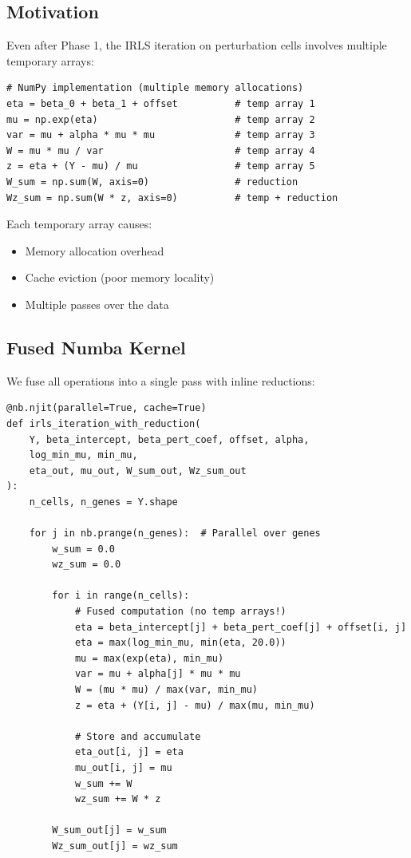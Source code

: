 \documentclass{article}
\begin{document}
\subsection{Motivation}

Even after Phase 1, the IRLS iteration on perturbation cells involves multiple temporary arrays:
\begin{lstlisting}
# NumPy implementation (multiple memory allocations)
eta = beta_0 + beta_1 + offset          # temp array 1
mu = np.exp(eta)                        # temp array 2
var = mu + alpha * mu * mu              # temp array 3
W = mu * mu / var                       # temp array 4
z = eta + (Y - mu) / mu                 # temp array 5
W_sum = np.sum(W, axis=0)               # reduction
Wz_sum = np.sum(W * z, axis=0)          # temp + reduction
\end{lstlisting}

Each temporary array causes:
\begin{itemize}
    \item Memory allocation overhead
    \item Cache eviction (poor memory locality)
    \item Multiple passes over the data
\end{itemize}

\subsection{Fused Numba Kernel}

We fuse all operations into a single pass with inline reductions:

\begin{lstlisting}
@nb.njit(parallel=True, cache=True)
def irls_iteration_with_reduction(
    Y, beta_intercept, beta_pert_coef, offset, alpha,
    log_min_mu, min_mu,
    eta_out, mu_out, W_sum_out, Wz_sum_out
):
    n_cells, n_genes = Y.shape
    
    for j in nb.prange(n_genes):  # Parallel over genes
        w_sum = 0.0
        wz_sum = 0.0
        
        for i in range(n_cells):
            # Fused computation (no temp arrays!)
            eta = beta_intercept[j] + beta_pert_coef[j] + offset[i, j]
            eta = max(log_min_mu, min(eta, 20.0))
            mu = max(exp(eta), min_mu)
            var = mu + alpha[j] * mu * mu
            W = (mu * mu) / max(var, min_mu)
            z = eta + (Y[i, j] - mu) / max(mu, min_mu)
            
            # Store and accumulate
            eta_out[i, j] = eta
            mu_out[i, j] = mu
            w_sum += W
            wz_sum += W * z
        
        W_sum_out[j] = w_sum
        Wz_sum_out[j] = wz_sum
\end{lstlisting}
\end{document}
